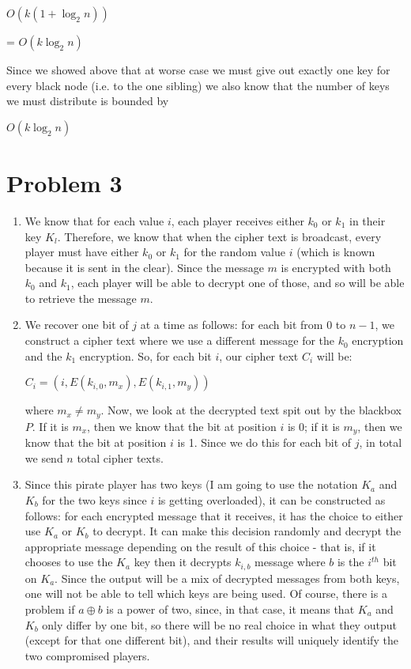 \documentclass{article}
\begin{document}
\begin{enumerate}
$O(k(1 + \log_2 n))$

= $O(k \log_2 n)$

Since we showed above that at worse case we must give out exactly one key for every black node (i.e. to the one sibling) we also know that the number of keys we must distribute is bounded by 

$O(k \log_2 n)$

\end{enumerate}

\section*{Problem 3}
\begin{enumerate}
\item %
We know that for each value $i$, each player receives either $k_0$ or $k_1$ in their key $K_l$. Therefore, we know that when the cipher text is broadcast, every player must have either $k_0$ or $k_1$ for the random value $i$ (which is known because it is sent in the clear). Since the message $m$ is encrypted with both $k_0$ and $k_1$, each player will be able to decrypt one of those, and so will be able to retrieve the message $m$.

\item %
We recover one bit of $j$ at a time as follows: for each bit from 0 to $n-1$, we construct a cipher text where we use a different message for the $k_{0}$ encryption and the $k_{1}$ encryption. So, for each bit $i$, our cipher text $C_{i}$ will be:

$C_{i} = (   i, E(k_{i,0}, m_x), E(k_{i,1}, m_y))$

where $m_x \neq m_y$. Now, we look at the decrypted text spit out by the blackbox $P$. If it is $m_x$, then we know that the bit at position $i$ is 0; if it is $m_y$, then we know that the bit at position $i$ is 1. Since we do this for each bit of $j$, in total we send $n$ total cipher texts.

\item %
Since this pirate player has two keys (I am going to use the notation $K_a$ and $K_b$ for the two keys since $i$ is getting overloaded), it can be constructed as follows: for each encrypted message that it receives, it has the choice to either use $K_a$ or $K_b$ to decrypt. It can make this decision randomly and decrypt the appropriate message depending on the result of this choice - that is, if it chooses to use the $K_a$ key then it decrypts $k_{i,b}$ message where $b$ is the $i^{th}$ bit on $K_a$. Since the output will be a mix of decrypted messages from both keys, one will not be able to tell which keys are being used. Of course, there is a problem if $a \oplus b$ is a power of two, since, in that case, it means that $K_a$ and $K_b$ only differ by one bit, so there will be no real choice in what they output (except for that one different bit), and their results will uniquely identify the two compromised players.

\end{enumerate}
\end{document}
